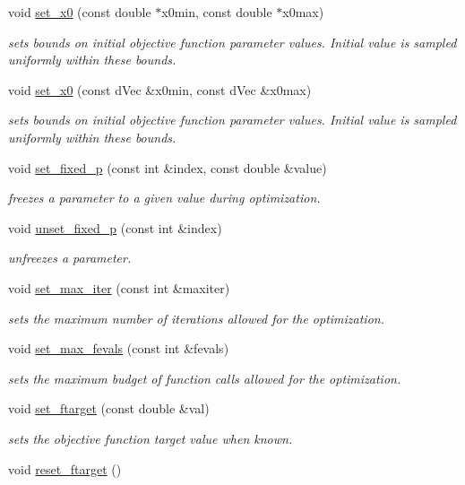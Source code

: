 \begin{DoxyCompactItemize}
void \hyperlink{classlibcmaes_1_1Parameters_addda8e395450878e87538df7b4032cbe}{set\-\_\-x0} (const double $\ast$x0min, const double $\ast$x0max)
\begin{DoxyCompactList}\small\item\em sets bounds on initial objective function parameter values. Initial value is sampled uniformly within these bounds. \end{DoxyCompactList}\item 
void \hyperlink{classlibcmaes_1_1Parameters_acc94e18faebb18dcaa0712a296e76949}{set\-\_\-x0} (const d\-Vec \&x0min, const d\-Vec \&x0max)
\begin{DoxyCompactList}\small\item\em sets bounds on initial objective function parameter values. Initial value is sampled uniformly within these bounds. \end{DoxyCompactList}\item 
void \hyperlink{classlibcmaes_1_1Parameters_a30236ca44b7de58b160bf2b1170f69b2}{set\-\_\-fixed\-\_\-p} (const int \&index, const double \&value)
\begin{DoxyCompactList}\small\item\em freezes a parameter to a given value during optimization. \end{DoxyCompactList}\item 
void \hyperlink{classlibcmaes_1_1Parameters_a540a57691845698e79af120f16d27f2c}{unset\-\_\-fixed\-\_\-p} (const int \&index)
\begin{DoxyCompactList}\small\item\em unfreezes a parameter. \end{DoxyCompactList}\item 
void \hyperlink{classlibcmaes_1_1Parameters_acefab965b50d45c6609e4f3267785ace}{set\-\_\-max\-\_\-iter} (const int \&maxiter)
\begin{DoxyCompactList}\small\item\em sets the maximum number of iterations allowed for the optimization. \end{DoxyCompactList}\item 
void \hyperlink{classlibcmaes_1_1Parameters_aa924cb4c8ffee0d148b63f5c0b55b4ce}{set\-\_\-max\-\_\-fevals} (const int \&fevals)
\begin{DoxyCompactList}\small\item\em sets the maximum budget of function calls allowed for the optimization. \end{DoxyCompactList}\item 
void \hyperlink{classlibcmaes_1_1Parameters_a6ace7e5d230fcf82c70ba2dd3a801f97}{set\-\_\-ftarget} (const double \&val)
\begin{DoxyCompactList}\small\item\em sets the objective function target value when known. \end{DoxyCompactList}\item 
\hypertarget{classlibcmaes_1_1Parameters_aec14ab6c39a12e347080fa7e0f2e7c9f}{void \hyperlink{classlibcmaes_1_1Parameters_aec14ab6c39a12e347080fa7e0f2e7c9f}{reset\-\_\-ftarget} ()}\label{classlibcmaes_1_1Parameters_aec14ab6c39a12e347080fa7e0f2e7c9f}


\end{DoxyCompactItemize}
